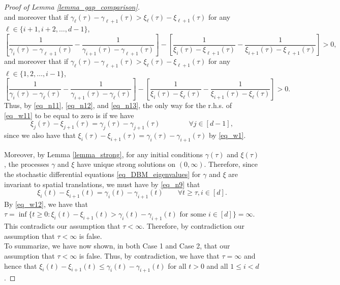 \documentclass[11pt,letterpaper]{article}
\begin{document}
\begin{proof}[Proof of Lemma \ref{lemma_gap_comparison}]
\begin{equation}
\end{equation}
%
and moreover that if   $\gamma_\ell(\tau) - \gamma_{\ell+1}(\tau) > \xi_\ell(\tau) - \xi_{\ell+1}(\tau)$ for any $\ell \in \{i+1,i+2, \ldots, d-1\}$, 
%
\begin{equation}\label{eq_n12}
\left[\frac{1}{\gamma_i(\tau) - \gamma_{\ell+1}(\tau)}
%
-  \frac{1}{\gamma_{i+1}(\tau) - \gamma_{\ell+1}(\tau)} \right] - \left[ \frac{1}{\xi_i(\tau) - \xi_{\ell+1}(\tau)} -  \frac{1}{\xi_{i+1}(\tau) - \xi_{\ell+1}(\tau)} \right] >0,
\end{equation}
%
and moreover that if   $\gamma_\ell(\tau) - \gamma_{\ell+1}(\tau) > \xi_\ell(\tau) - \xi_{\ell+1}(\tau)$ for any $\ell \in \{1,2, \ldots, i-1\}$,
\begin{equation}\label{eq_n13}
\left[\frac{1}{\gamma_i(\tau) - \gamma_{\ell}(\tau)}
%
-  \frac{1}{\gamma_{i+1}(\tau) - \gamma_{\ell}(\tau)} \right] - \left[ \frac{1}{\xi_i(\tau) - \xi_{\ell}(\tau)} -  \frac{1}{\xi_{i+1}(\tau) - \xi_{\ell}(\tau)} \right] >0.
\end{equation}
%
Thus, by \eqref{eq_n11}, \eqref{eq_n12}, and \eqref{eq_n13}, the only way for the r.h.s. of \eqref{eq_w11} to be equal to zero is if we have
%
\begin{equation}\label{eq_n9}
    \xi_j(\tau) -\xi_{j+1}(\tau) = \gamma_j(\tau) -\gamma_{j+1}(\tau) \qquad  \qquad \forall j \in [d-1],
    \end{equation}
   since we also have that $\xi_i(\tau) -\xi_{i+1}(\tau) = \gamma_i(\tau) -\gamma_{i+1}(\tau)$  
 by \eqref{eq_w1}.
%
%
%

Moreover, by Lemma \ref{lemma_strong}, for any initial conditions $\gamma(\tau)$ and $\xi(\tau)$, the processes $\gamma$ and $\xi$ have unique strong solutions  on $(0,\infty)$.
%
Therefore, since the stochastic differential equations \eqref{eq_DBM_eigenvalues} for $\gamma$ and $\xi$ are invariant to spatial translations, we must have by \eqref{eq_n9} that
%
\begin{equation}\label{eq_w12}
    \xi_i(t) -\xi_{i+1}(t) = \gamma_i(t) -\gamma_{i+1}(t) \qquad \forall t \geq \tau, i \in [d].
\end{equation}
%
By \eqref{eq_w12}, we have that  $\tau = \inf\{t\geq 0: \xi_i(t) - \xi_{i+1}(t) > \gamma_i(t) - \gamma_{i+1}(t) \textrm{ for some } i \in [d]  \} = \infty$.
%
This contradicts our assumption that $\tau < \infty$.
%
Therefore, by contradiction our assumption that $\tau < \infty$ is false.\\
%
To summarize, we have now shown, in both Case 1 and Case 2, that our assumption that $\tau< \infty$ is false.
%
Thus, by contradiction, we have that $\tau= \infty$ and hence that $\xi_i(t) - \xi_{i+1}(t)  \leq \gamma_i(t) - \gamma_{i+1}(t)$ for all  $t>0$ and all $1\leq i < d$.





\end{proof}
\end{document}
